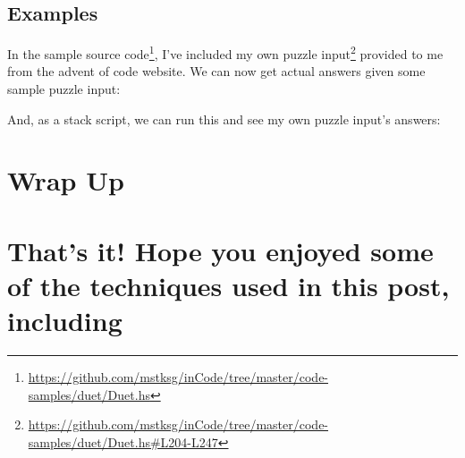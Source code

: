 \documentclass[]{article}
\newenvironment{Shaded}{}{}
\newcommand{\CommentTok}[1]{\textcolor[rgb]{0.38,0.63,0.69}{\textit{#1}}}
\newcommand{\DataTypeTok}[1]{\textcolor[rgb]{0.56,0.13,0.00}{#1}}
\newcommand{\ExtensionTok}[1]{#1}
\newcommand{\FunctionTok}[1]{\textcolor[rgb]{0.02,0.16,0.49}{#1}}
\newcommand{\KeywordTok}[1]{\textcolor[rgb]{0.00,0.44,0.13}{\textbf{#1}}}
\newcommand{\NormalTok}[1]{#1}
\newcommand{\OperatorTok}[1]{\textcolor[rgb]{0.40,0.40,0.40}{#1}}
\newcommand{\OtherTok}[1]{\textcolor[rgb]{0.00,0.44,0.13}{#1}}
\renewcommand{\href}[2]{#2\footnote{\url{#1}}}
\begin{document}
\subsection{Examples}\label{examples}

In the
\href{https://github.com/mstksg/inCode/tree/master/code-samples/duet/Duet.hs}{sample
source code}, I've included
\href{https://github.com/mstksg/inCode/tree/master/code-samples/duet/Duet.hs\#L204-L247}{my
own puzzle input} provided to me from the advent of code website. We can now get
actual answers given some sample puzzle input:

\begin{Shaded}
\end{Shaded}

And, as a stack script, we can run this and see my own puzzle input's answers:

\begin{Shaded}
\end{Shaded}

\section{Wrap Up}\label{wrap-up}

\section{That's it! Hope you enjoyed some of the techniques used in this post,
including}\label{thats-it-hope-you-enjoyed-some-of-the-techniques-used-in-this-post-including}
\end{document}
